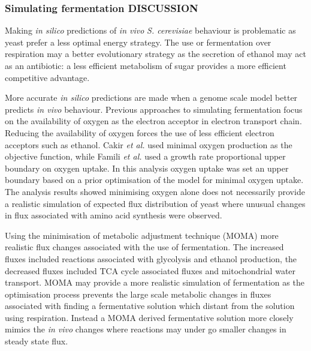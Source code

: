 \subsubsection{Simulating fermentation DISCUSSION}

Making \emph{in silico} predictions of \emph{in vivo} \emph{S. cerevisiae} behaviour is problematic as yeast prefer a less optimal energy strategy. The use or fermentation over respiration may a better evolutionary strategy as the secretion of ethanol may act as an antibiotic: a less efficient metabolism of sugar provides a more efficient competitive advantage.

More accurate \emph{in silico} predictions are made when a genome scale model better predicts \emph{in vivo} behaviour. Previous approaches to simulating fermentation focus on the availability of oxygen as the electron acceptor in electron transport chain. Reducing the availability of oxygen forces the use of less efficient electron acceptors such as ethanol. Cakir \emph{et al.} \cite{cakir2007} used minimal oxygen production as the objective function, while Famili \emph{et al.} \cite{famili2003} used a growth rate proportional upper boundary on oxygen uptake. In this analysis oxygen uptake was set an upper boundary based on a prior optimisation of the model for minimal oxygen uptake. The analysis results showed minimising oxygen alone does not necessarily provide a realistic simulation of expected flux distribution of yeast where unusual changes in flux associated with amino acid synthesis were observed.

Using the minimisation of metabolic adjustment technique (MOMA) more realistic flux changes associated with the use of fermentation. The increased fluxes included reactions associated with glycolysis and ethanol production, the decreased fluxes included TCA cycle associated fluxes and mitochondrial water transport. MOMA may provide a more realistic simulation of fermentation as the optimisation process prevents the large scale metabolic changes in fluxes associated with finding a fermentative solution which distant from the solution using respiration. Instead a MOMA derived fermentative solution more closely mimics the \emph{in vivo} changes where reactions may under go smaller changes in steady state flux.


